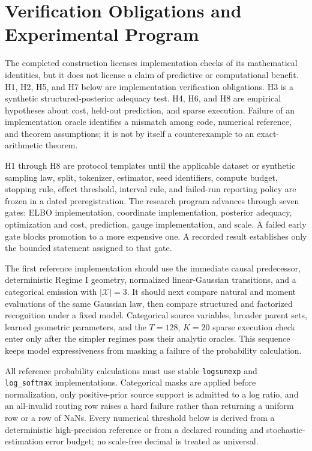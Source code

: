 \chapter[Verification Obligations and Experimental Program]{Verification Obligations and\\Experimental Program}

The completed construction licenses implementation checks of its mathematical identities, but it does not license a claim of predictive or computational benefit. H1, H2, H5, and H7 below are implementation verification obligations. H3 is a synthetic structured-posterior adequacy test. H4, H6, and H8 are empirical hypotheses about cost, held-out prediction, and sparse execution. Failure of an implementation oracle identifies a mismatch among code, numerical reference, and theorem assumptions; it is not by itself a counterexample to an exact-arithmetic theorem.

H1 through H8 are protocol templates until the applicable dataset or synthetic sampling law, split, tokenizer, estimator, seed identifiers, compute budget, stopping rule, effect threshold, interval rule, and failed-run reporting policy are frozen in a dated preregistration. The research program advances through seven gates: ELBO implementation, coordinate implementation, posterior adequacy, optimization and cost, prediction, gauge implementation, and scale. A failed early gate blocks promotion to a more expensive one. A recorded result establishes only the bounded statement assigned to that gate.

The first reference implementation should use the immediate causal predecessor, deterministic Regime I geometry, normalized linear-Gaussian transitions, and a categorical emission with $|\mathcal X|=3$. It should next compare natural and moment evaluations of the same Gaussian law, then compare structured and factorized recognition under a fixed model. Categorical source variables, broader parent sets, learned geometric parameters, and the $T=128$, $K=20$ sparse execution check enter only after the simpler regimes pass their analytic oracles. This sequence keeps model expressiveness from masking a failure of the probability calculation.

All reference probability calculations must use stable \texttt{logsumexp} and \texttt{log\_softmax} implementations. Categorical masks are applied before normalization, only positive-prior source support is admitted to a log ratio, and an all-invalid routing row raises a hard failure rather than returning a uniform row or a row of NaNs. Every numerical threshold below is derived from a deterministic high-precision reference or from a declared rounding and stochastic-estimation error budget; no scale-free decimal is treated as universal.

